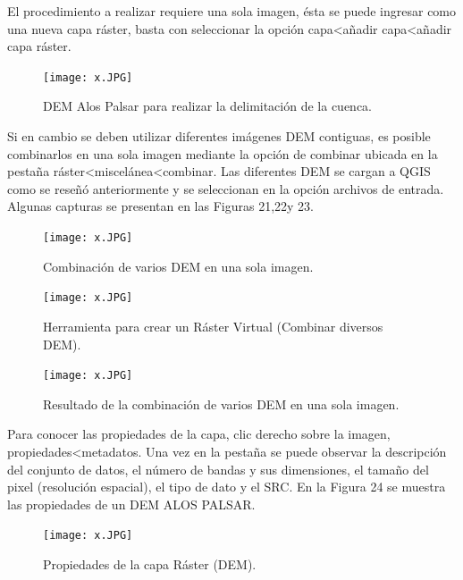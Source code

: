 \documentclass[12pt,hidelinks]{article}
\begin{document}
El procedimiento a realizar requiere una sola imagen, ésta se puede ingresar como una nueva
capa ráster, basta con seleccionar la opción capa<añadir capa<añadir capa ráster.
\begin{figure}[H]
    \centering
    \texttt{[image: x.JPG]}
    \caption{DEM Alos Palsar para realizar la delimitación de la cuenca.}
    \label{fig:my_label}
\end{figure}
Si en cambio se deben utilizar diferentes imágenes DEM contiguas, es posible combinarlos en una sola imagen mediante la opción de combinar ubicada en la pestaña ráster<miscelánea<combinar. Las diferentes DEM se cargan a QGIS como se reseñó anteriormente y se seleccionan en la opción archivos de entrada. Algunas capturas se presentan en las Figuras 21,22y 23.
\begin{figure}[H]
    \centering
    \texttt{[image: x.JPG]}
    \caption{Combinación de varios DEM en una sola imagen.}
    \label{fig:my_label}
\end{figure}
\begin{figure}[H]
    \centering
    \texttt{[image: x.JPG]}
    \caption{Herramienta para crear un Ráster Virtual (Combinar diversos DEM).}
    \label{fig:my_label}
\end{figure}
\begin{figure}[H]
    \centering
    \texttt{[image: x.JPG]}
    \caption{Resultado de la combinación de varios DEM en una sola imagen.}
    \label{fig:my_label}
\end{figure}
Para conocer las propiedades de la capa, clic derecho sobre la imagen, propiedades<metadatos. Una vez en la pestaña se puede observar la descripción del conjunto de datos, el número de bandas y sus dimensiones, el tamaño del pixel (resolución espacial), el tipo de dato y el SRC. En la Figura 24 se muestra las propiedades de un DEM ALOS PALSAR.
\begin{figure}[H]
    \centering
    \texttt{[image: x.JPG]}
    \caption{Propiedades de la capa Ráster (DEM).}
    \label{fig:my_label}
\end{figure}
\end{document}
